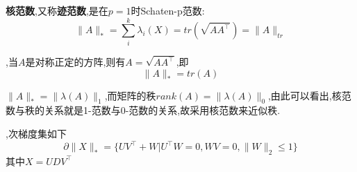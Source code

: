 \documentclass[UTF8]{ctexart}
\newcommand{\s}{\quad}
\renewcommand{\b}{\textbf}
\newcommand{\p}{\paragraph{}\s}
\newcommand{\equ}[1]{\begin{equation}#1\end{equation}}
\newcommand{\norm}[1]{\lVert#1\rVert}
\newcommand{\Real}[1]{\mathbb{R}^{#1}}
\newcommand{\nunorm}{\norm{X}_*}
\numberwithin{equation}{section}
\begin{document}
\b{核范数},又称\b{迹范数},是在$p=1$时Schaten-p范数:
\[\norm{A}_*=\sum_i^k\lambda_i(X)=tr(\sqrt{AA^\top})=\norm{A}_{tr}\]


,当$A$是对称正定的方阵,则有$A=\sqrt{AA^\top}$,即
\[\norm{A}_*=tr(A)\]

$\norm{A}_*=\norm{\lambda(A)}_1$,而矩阵的秩$rank(A)=\norm{\lambda(A)}_0$,由此可以看出,核范数与秩的关系就是1-范数与0-范数的关系,故采用核范数来近似秩.

,次梯度集如下
\equ{\partial\nunorm=\{UV^\top+W\vert U^\top W=0,WV=0,\norm{W}_2\leq1\}}
其中$X=UDV^\top$
\end{document}
